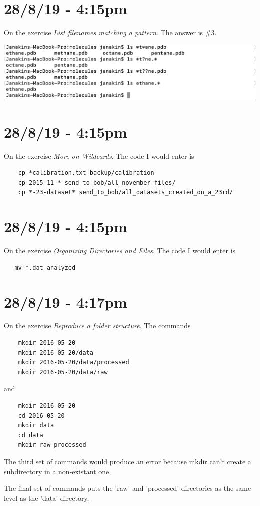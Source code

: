 \documentclass{article}
\begin{document}
\section*{28/8/19 - 4:15pm}

On the exercise \textit{List filenames matching a pattern}. The answer is \#3.

\includegraphics[width=\textwidth]{figk.png}

\section*{28/8/19 - 4:15pm}

On the exercise \textit{More on Wildcards}. The code I would enter is \begin{verbatim}
    cp *calibration.txt backup/calibration
    cp 2015-11-* send_to_bob/all_november_files/
    cp *-23-dataset* send_to_bob/all_datasets_created_on_a_23rd/
\end{verbatim}

\section*{28/8/19 - 4:15pm}

On the exercise \textit{Organizing Directories and Files}. The code I would enter is \begin{verbatim}
   mv *.dat analyzed
\end{verbatim}

\section*{28/8/19 - 4:17pm}

On the exercise \textit{Reproduce a folder structure}. The commands \begin{verbatim}
    mkdir 2016-05-20
    mkdir 2016-05-20/data
    mkdir 2016-05-20/data/processed
    mkdir 2016-05-20/data/raw
\end{verbatim}
and
\begin{verbatim}
    mkdir 2016-05-20
    cd 2016-05-20
    mkdir data
    cd data
    mkdir raw processed
\end{verbatim}

The third set of commands would produce an error because mkdir can't create a subdirectory in a non-existant one.

The final set of commands puts the 'raw' and 'processed' directories as the same level as the 'data' directory.
\end{document}
